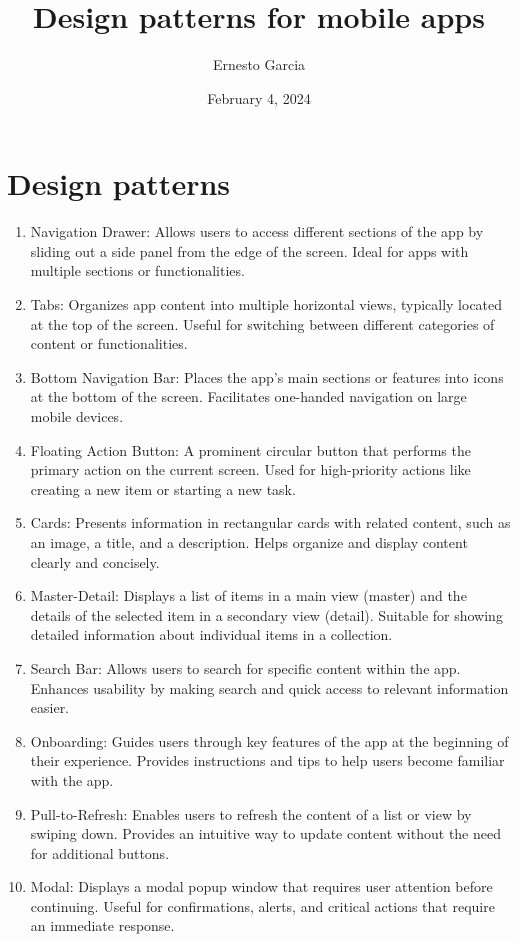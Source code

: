 \documentclass{article}
\title{Design patterns for mobile apps}
\author{Ernesto Garcia}
\date{February 4, 2024}
\begin{document}
\maketitle

\section{Design patterns}

\begin{enumerate}
    \item Navigation Drawer: Allows users to access different sections of the app by sliding out a side panel from the edge of the screen. Ideal for apps with multiple sections or functionalities.
    \item Tabs: Organizes app content into multiple horizontal views, typically located at the top of the screen. Useful for switching between different categories of content or functionalities.
    \item Bottom Navigation Bar: Places the app's main sections or features into icons at the bottom of the screen. Facilitates one-handed navigation on large mobile devices.
    \item Floating Action Button: A prominent circular button that performs the primary action on the current screen. Used for high-priority actions like creating a new item or starting a new task.
    \item Cards: Presents information in rectangular cards with related content, such as an image, a title, and a description. Helps organize and display content clearly and concisely.
    \item Master-Detail: Displays a list of items in a main view (master) and the details of the selected item in a secondary view (detail). Suitable for showing detailed information about individual items in a collection.
    \item Search Bar: Allows users to search for specific content within the app. Enhances usability by making search and quick access to relevant information easier.
    \item Onboarding: Guides users through key features of the app at the beginning of their experience. Provides instructions and tips to help users become familiar with the app.
    \item Pull-to-Refresh: Enables users to refresh the content of a list or view by swiping down. Provides an intuitive way to update content without the need for additional buttons.
    \item Modal: Displays a modal popup window that requires user attention before continuing. Useful for confirmations, alerts, and critical actions that require an immediate response.
\end{enumerate}
\end{document}
